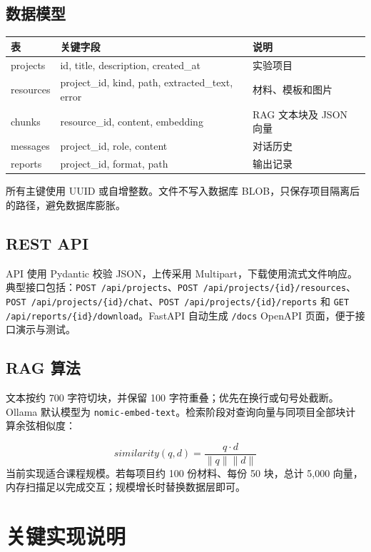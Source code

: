 \documentclass[12pt,a4paper]{ctexart}
\begin{document}
\subsection{数据模型}
\begin{table}[H]
\centering\small
\begin{tabularx}{\textwidth}{|X|X|X|}
\hline
\textbf{表} & \textbf{关键字段} & \textbf{说明} \\ \hline
projects & id, title, description, created\_at & 实验项目 \\ \hline
resources & project\_id, kind, path, extracted\_text, error & 材料、模板和图片 \\ \hline
chunks & resource\_id, content, embedding & RAG 文本块及 JSON 向量 \\ \hline
messages & project\_id, role, content & 对话历史 \\ \hline
reports & project\_id, format, path & 输出记录 \\ \hline
\end{tabularx}
\end{table}
所有主键使用 UUID 或自增整数。文件不写入数据库 BLOB，只保存项目隔离后的路径，避免数据库膨胀。

\subsection{REST API}
API 使用 Pydantic 校验 JSON，上传采用 Multipart，下载使用流式文件响应。典型接口包括：\texttt{POST /api/projects}、\texttt{POST /api/projects/\{id\}/resources}、\texttt{POST /api/projects/\{id\}/chat}、\texttt{POST /api/projects/\{id\}/reports} 和 \texttt{GET /api/reports/\{id\}/download}。FastAPI 自动生成 \texttt{/docs} OpenAPI 页面，便于接口演示与测试。

\subsection{RAG 算法}
文本按约 700 字符切块，并保留 100 字符重叠；优先在换行或句号处截断。Ollama 默认模型为 \texttt{nomic-embed-text}。检索阶段对查询向量与同项目全部块计算余弦相似度：

\[similarity(q,d)=\frac{q\cdot d}{\lVert q\rVert\lVert d\rVert}\]
当前实现适合课程规模。若每项目约 100 份材料、每份 50 块，总计 5,000 向量，内存扫描足以完成交互；规模增长时替换数据层即可。

\section{关键实现说明}
\end{document}
